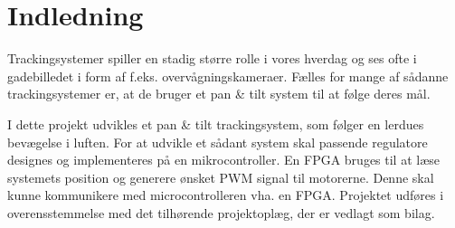 \section*{Indledning}
Trackingsystemer spiller en stadig større rolle i vores hverdag og ses ofte i gadebilledet i form 
af f.eks. overvågningskameraer.
Fælles for mange af sådanne trackingsystemer er, at de bruger et pan \& tilt system til at følge deres mål. 

I dette projekt udvikles et pan \& tilt trackingsystem, som følger en lerdues bevægelse i 
luften. For at udvikle et sådant system skal passende regulatore designes og implementeres
på en mikrocontroller. 
En FPGA  bruges til at læse systemets position og generere ønsket PWM signal til motorerne. 
Denne skal kunne kommunikere med microcontrolleren vha. en FPGA. 
Projektet udføres i overensstemmelse med det tilhørende projektoplæg, der er vedlagt 
som bilag.
